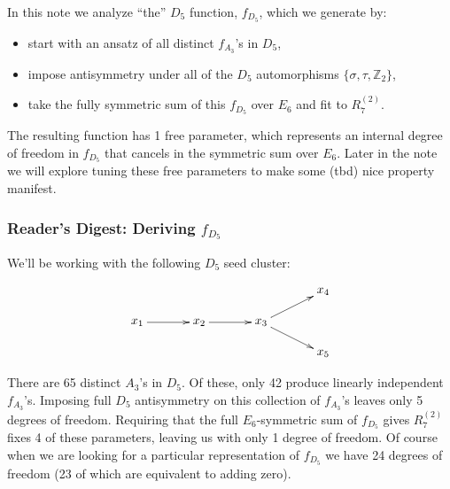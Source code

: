 \documentclass[12pt]{article}
\def\a{\mathcal{A}}
\def\fd5{f_{D_5}}
\def\fa3{f_{A_3}}
\def\a2{A_2}
\def\a3{A_3}
\def\d5{D_5}
\def\e6{E_6}
\def\r27{R^{(2)}_7}
\begin{document}
\thispagestyle{fancyplain}
 
\fancyhf{} 
 
\cfoot{\fancyplain{}{\thepage}}

\lhead{\textbf{Describing the $\d5$ function} \hfill \today}

In this note we analyze ``the'' $\d5$ function, $\fd5$, which we generate by:
\begin{itemize}
	\item start with an ansatz of all distinct $\fa3$'s in $\d5$,
	\item impose antisymmetry under all of the $\d5$ automorphisms $\{\sigma, \tau, \mathbb{Z}_2\}$,
	\item take the fully symmetric sum of this $\fd5$ over $\e6$ and fit to $\r27$.
\end{itemize}
The resulting function has 1 free parameter, which represents an internal degree of freedom in $\fd5$ that cancels in the symmetric sum over $\e6$. Later in the note we will explore tuning these free parameters to make some (tbd) nice property manifest.

\subsubsection*{Reader's Digest: Deriving $\fd5$}

We'll be working with the following $\d5$ seed cluster:

\begin{equation}
\begin{gathered}
\begin{xy} 0;<1pt,0pt>:<0pt,-1pt>::
(0,25) *+{x_1} ="0",
(50,25) *+{x_2} ="1",
(100,25) *+{x_3} ="2",
(150,0) *+{x_4} ="3",
(150,50) *+{x_5} ="4",
"0", {\ar"1"},
"1", {\ar"2"},
"2", {\ar"3"},
"2", {\ar"4"},
\end{xy}
\end{gathered}
\end{equation}

There are 65 distinct $\a3$'s in $\d5$. Of these, only 42 produce linearly independent $\fa3$'s. Imposing full $\d5$ antisymmetry on this collection of $\fa3$'s leaves only 5 degrees of freedom. Requiring that the full $\e6$-symmetric sum of $\fd5$ gives $\r27$ fixes 4 of these parameters, leaving us with only 1 degree of freedom. Of course when we are looking for a particular representation of $\fd5$ we have 24 degrees of freedom (23 of which are equivalent to adding zero).\\
\end{document}
